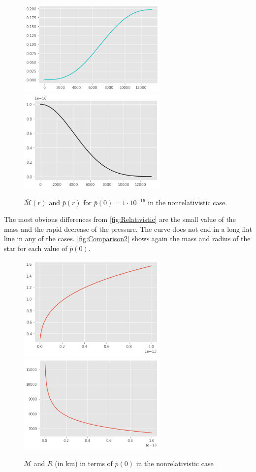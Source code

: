\documentclass[a4paper]{article}
\newcommand\Mbar{\bar{\mathcal{M}}}
\begin{document}
\begin{figure}[h]
    \includegraphics[width=7.3cm]{images/M-r Non-rel (2).png}
    \includegraphics[width=7.3cm]{images/p-r Non-Rel (2).png}
    \centering
    \caption{$\Mbar(r)$ and $\bar{p}(r)$ for $\bar{p}(0) = 1\cdot 10^{-16}$ in the nonrelativistic case.}
    \label{fig:nonrelativistic}
\end{figure}

The most obvious differences from \autoref{fig:Relativistic} are the small value of the mass and the rapid decrease of the pressure. The curve does not end in a long flat line in  any of the cases. \autoref{fig:Comparison2} shows again the mass and radius of the star for each value of $\bar{p}(0)$.

\begin{figure}[h]
    \includegraphics[width=7.3cm]{images/M-p0 Non-rel.png}
    \includegraphics[width=7.3cm]{images/R-p0 Non-Rel.png}
    \centering
    \caption{$\Mbar$ and $R$ (in km) in terms of $\bar{p}(0)$ in the nonrelativistic case}
\label{fig:Comparison2}
\end{figure}
\end{document}
